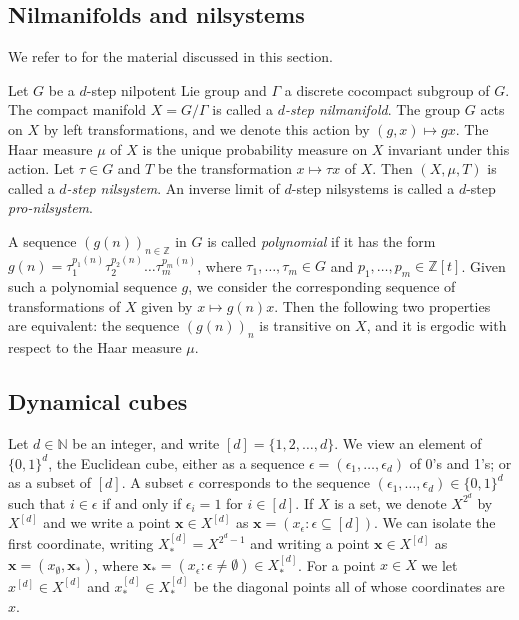 \documentclass[11pt,reqno]{amsart}
\newcommand{\Z}{\mathbb{Z}}
\newcommand{\N}{\mathbb{N}}
\newcommand{\bx}{{\boldsymbol x}}
\theoremstyle{definition}
\theoremstyle{remark}
\begin{document}
\subsection{Nilmanifolds and nilsystems}

We refer to {\cite[Chapters 10 and 11]{Host_Kra_nilpotent_structures_ergodic_theory:2018}} for the material discussed in this section.

Let $G$ be a $d$-step nilpotent Lie group and $\Gamma$ a discrete cocompact subgroup of $G$. The compact manifold $X = G/\Gamma$ is called a {\em $d$-step nilmanifold}. The group $G$ acts on $X$ by left transformations, and we denote this action by $(g,x)\mapsto gx$. The Haar measure $\mu$ of $X$ is the unique probability measure on $X$ invariant under this action. Let $\tau\in G$ and $T$ be the transformation $x\mapsto \tau x$ of $X$. Then $(X,\mu,T)$ is called a {\em $d$-step nilsystem}. An inverse limit of $d$-step nilsystems is called a $d$-step {\em pro-nilsystem}.

A sequence $(g(n))_{n\in\mathbb{Z}}$ in $G$ is called {\em polynomial} if it has the form $g(n) = \tau_1^{p_1(n)}\tau_2^{p_2(n)}\dots\tau_m^{p_m(n)}$, where $\tau_1,\dots,\tau_m\in G$ and $p_1,\dots,p_m\in \Z[t]$. Given such a polynomial sequence $g$, we consider the corresponding sequence of transformations of $X$ given by $x\mapsto g(n)x$. Then the following two properties are equivalent: the sequence $(g(n))_{n}$ is transitive on $X$, and it is ergodic with respect to the Haar measure $\mu$.

\subsection{Dynamical cubes}

Let $d \in\N$ be an integer, and write $[d] = \{1, 2, \dots, d\}$. We view an element of $\{0,1\}^{d}$, the Euclidean cube, either as a sequence $\epsilon = (\epsilon_{1}, \dots, \epsilon_{d})$ of 0's and 1's; or as a subset of $[d]$. A subset $\epsilon$ corresponds to the sequence $(\epsilon_{1}, \dots, \epsilon_{d}) \in \{0,1\}^{d}$ such that $i \in \epsilon$ if and only if $\epsilon_{i} = 1$ for $i \in [d]$. If $X$ is a set, we denote $X^{2^{d}}$ by $X^{[d]}$ and we write a point $\bx \in X^{[d]}$ as $\bx = (x_{\epsilon} : \epsilon \subseteq [d])$. We can isolate the first coordinate, writing $X^{[d]}_{*} = X^{2^{d}-1}$ and writing a point $\bx\in X^{[d]}$ as $\bx = (x_{\emptyset},\bx_{*})$, where $\bx_{*} = (x_{\epsilon}: \epsilon\neq \emptyset)\in X^{[d]}_{*}$. For a point $x\in X$ we let $x^{[d]}\in X^{[d]}$ and $x^{[d]}_{*}\in X^{[d]}_{*}$ be the diagonal points all of whose coordinates are $x$.
\end{document}

